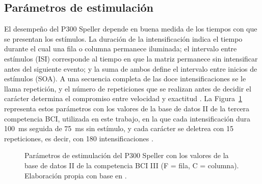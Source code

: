 \subsection{Parámetros de estimulación}

El desempeño del P300 Speller depende en buena medida de los tiempos con que se presentan los
estímulos. La duración de la intensificación indica el tiempo durante el cual una fila o columna
permanece iluminada; el intervalo entre estímulos (ISI) corresponde al tiempo en que la matriz
permanece sin intensificar antes del siguiente evento; y la suma de ambos define el intervalo entre
inicios de estímulos (SOA). A una secuencia completa de las doce intensificaciones se le llama
repetición, y el número de repeticiones que se realizan antes de decidir el carácter determina el
compromiso entre velocidad y exactitud \cite{krusienski2008}. La Figura~\ref{fig:tiempos}
representa estos parámetros con los valores de la base de datos II de la tercera competencia BCI,
utilizada en este trabajo, en la que cada intensificación dura 100~ms seguida de 75~ms sin
estímulo, y cada carácter se deletrea con 15 repeticiones, es decir, con 180 intensificaciones
\cite{blankertz2006}.

\begin{figure}[htbp]
\centering
{}
\caption{Parámetros de estimulación del P300 Speller con los valores de la base de datos II de la
competencia BCI III (F = fila, C = columna). Elaboración propia con base en \cite{blankertz2006}.}
\label{fig:tiempos}
\end{figure}

